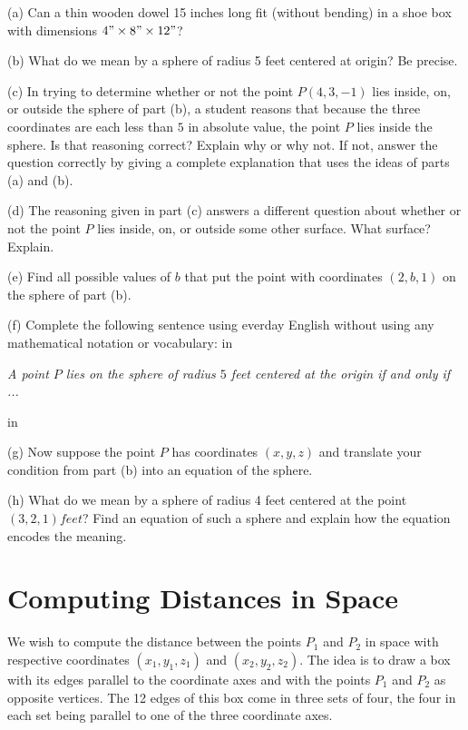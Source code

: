 \documentclass{ximera}
\newcommand{\pskip}{\vskip 0.1 in}
\begin{document}
\begin{question}   \label{QLMn4947332}
\begin{freeResponse}
(a) Can a thin wooden dowel 15 inches long fit (without bending) in a shoe box with dimensions $4"\times 8"\times 12"$?

(b) What do we mean by a sphere of radius 5 feet centered at origin? Be precise.

(c) In trying to determine whether or not the point $P(4,3,-1)$ lies inside, on, or outside the sphere of part (b), a student reasons that because the three coordinates are each less than $5$ in absolute value, the point $P$ lies inside the sphere. Is that reasoning correct? Explain why or why not. If not, answer the question correctly by giving a complete explanation that uses the ideas of parts (a) and (b). 



(d) The reasoning given in part (c) answers a different question about whether or not the point $P$ lies inside, on, or outside  some other surface. What surface? Explain.

(e) Find all possible values of $b$ that put the point with coordinates $(2,b,1)$ on the sphere of part (b).

(f) Complete the following sentence using everday English without using any mathematical notation or vocabulary:
\pskip

\emph{A point $P$ lies on the sphere of radius $5$ feet centered at the origin if and only if ...}

\pskip

(g)  Now suppose the point $P$ has coordinates $(x,y,z)$ and translate your condition from part (b) into an equation of the sphere.
 
(h) What do we mean by a sphere of radius 4 feet centered at the point $(3,2,1) feet$? Find an equation of such a sphere and explain how the equation encodes the meaning.

\end{freeResponse}

\end{question}


\section*{Computing Distances in Space}
We wish to compute the distance between the points $P_1$ and $P_2$ in space with respective coordinates $(x_1, y_1, z_1)$ and $(x_2, y_2, z_2)$. The idea is to draw a box with its edges parallel to the coordinate axes and with the points $P_1$ and $P_2$ as opposite vertices. The 12 edges of this box come in three sets of four, the four in each set being parallel to one of the three coordinate axes. 
\end{document}
